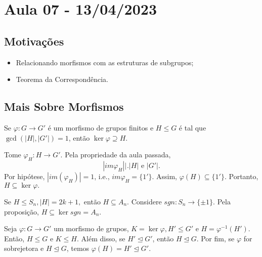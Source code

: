 \documentclass[algebra_notes.tex]{subfiles}
\begin{document}
\section{Aula 07 - 13/04/2023}
\subsection{Motivações}
\begin{itemize}
	\item Relacionando morfismos com as estruturas de subgrupos;
	\item Teorema da Correspondência.
\end{itemize}

\subsection{Mais Sobre Morfismos}
\begin{prop*}
	Se $\varphi:G\rightarrow G'$ é um morfismo de grupos finitos e $H\leq{G}$ é tal que  $\gcd{(|H|, |G'|)} = 1$, então $\ker{\varphi}\supseteq{H}.$
\end{prop*}
\begin{proof*}
	Tome $\varphi_{H}:H\rightarrow G'$. Pela propriedade da aula passada,
	$$
		|im{\varphi_{H}}|\biggl|_{}^{}\biggr. |H|\text{ e } |G'|.
	$$
	Por hipótese, $|im(\varphi_{H})|=1$, i.e., $im \varphi_{H} = \{1'\}$. Assim, $\varphi(H)\subseteq{\{1'\}}.$
	Portanto, $H\subseteq{\ker{\varphi}}.$ \qedsymbol
\end{proof*}
\begin{example*}
	Se $H\leq{S_{n}}, |H| = 2k+1,$ então $H\subseteq{A_{n}}.$ Considere $sgn:S_{n}\rightarrow \{\pm1\}$. Pela proposição,
	$H\subseteq{\ker{sgn}}=A_{n}.$
\end{example*}
\begin{prop*}
	Seja $\varphi:G\rightarrow G'$ um morfismo de grupos, $K=\ker{\varphi}, H'\leq{G'}$ e $H = \varphi^{-1}(H').$ Então,
	$H\leq{G}$ e $K\leq{H}.$ Além disso, se $H'\trianglelefteq{G'}$, então $H\trianglelefteq{G}$. Por fim, se $\varphi$ for
	sobrejetora e $H\trianglelefteq{G}$, temos $\varphi(H) = H'\trianglelefteq{G'}.$
\end{prop*}
\end{document}
